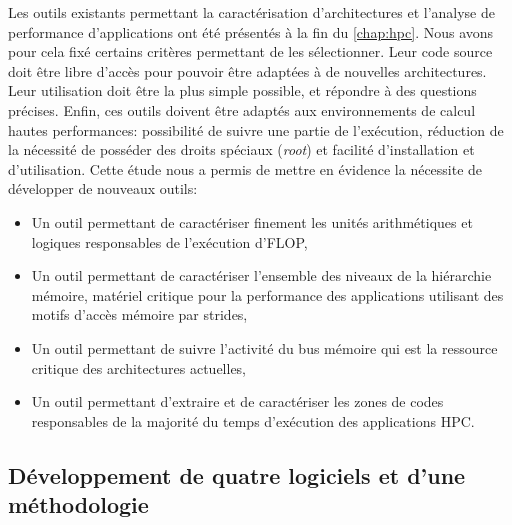         Les outils existants permettant la caractérisation d'architectures et l’analyse de performance d'applications ont été présentés à la fin du \autoref{chap:hpc}. Nous avons pour cela fixé certains critères permettant de les sélectionner. Leur code source doit être libre d'accès pour pouvoir être adaptées à de nouvelles architectures. Leur utilisation doit être la plus simple possible, et répondre à des questions précises. Enfin, ces outils doivent être adaptés aux environnements de calcul hautes performances: possibilité de suivre une partie de l'exécution, réduction de la nécessité de posséder des droits spéciaux (\textit{root}) et facilité d'installation et d'utilisation. Cette étude nous a permis de mettre en évidence la nécessite de développer de nouveaux outils:
        \begin{itemize}
            \item Un outil permettant de caractériser finement les unités arithmétiques et logiques responsables de l'exécution d'\gls{FLOP}, 
            \item Un outil permettant de caractériser l'ensemble des niveaux de la hiérarchie mémoire, matériel critique pour la performance des applications utilisant des motifs d'accès mémoire par \glspl{stride},
            \item Un outil permettant de suivre l'activité du bus mémoire qui est la ressource critique des architectures actuelles,
            \item Un outil permettant d'extraire et de caractériser les zones de codes responsables de la majorité du temps d'exécution des applications HPC.
        \end{itemize}
        
        
    \subsection{Développement de quatre logiciels et d'une méthodologie}
        
